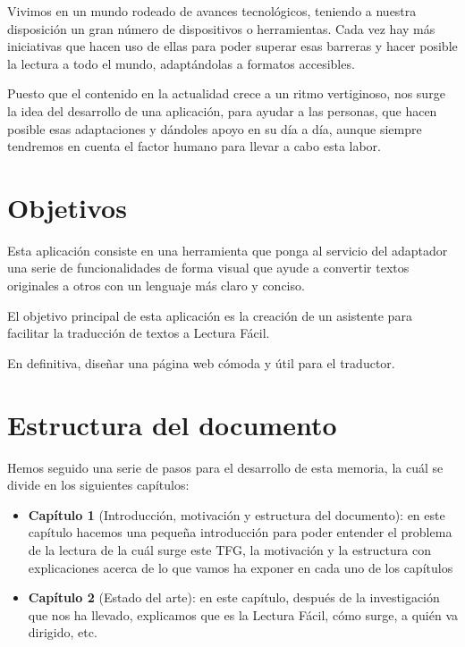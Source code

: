 \setlength{\parskip}{10pt}
Vivimos en un mundo rodeado de avances tecnológicos, teniendo a nuestra disposición un gran número de dispositivos o herramientas. Cada vez hay más iniciativas que hacen uso de ellas para poder superar esas barreras y hacer posible la lectura a todo el mundo, adaptándolas a formatos accesibles. 

 \setlength{\parskip}{10pt}
 
Puesto que el contenido en la actualidad crece a un ritmo vertiginoso, nos surge la idea del desarrollo de una aplicación, para ayudar a las personas, que hacen posible esas adaptaciones y dándoles apoyo en su día a día, aunque siempre tendremos en cuenta el factor humano para llevar a cabo esta labor.


\section{Objetivos}
Esta aplicación consiste en una herramienta que ponga al servicio del adaptador una serie de funcionalidades de forma visual que ayude a convertir textos originales a otros con un lenguaje más claro y conciso.

 \setlength{\parskip}{10pt}
 
El objetivo principal de esta aplicación es la creación de un asistente para facilitar la traducción de textos a Lectura Fácil. 

 \setlength{\parskip}{10pt}


En definitiva, diseñar una página web cómoda y útil para el traductor.

\section{Estructura del documento}


Hemos seguido una serie de pasos para el desarrollo de esta memoria, la cuál se divide en los siguientes capítulos:

\begin{itemize}
	\item {\textbf{Capítulo 1}} (Introducción, motivación y estructura del documento): en este capítulo hacemos una pequeña introducción para poder entender el problema de la lectura de la cuál surge este TFG, la motivación y la estructura con explicaciones acerca de lo que vamos ha exponer en cada uno de los capítulos
	
 \setlength{\parskip}{10pt}
	
	\item{\textbf{ Capítulo 2}} (Estado del arte): en este capítulo, después de la investigación que nos ha llevado, explicamos que es la Lectura Fácil, cómo surge, a quién va dirigido, etc.

\end{itemize}

